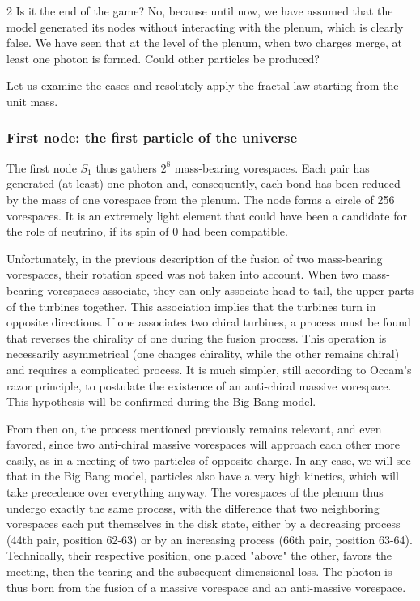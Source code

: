 \begin{multicols}{2}
	Is it the end of the game? No, because until now, we have assumed that 
	the model generated its nodes without interacting with the plenum, which 
	is clearly false. We have seen that at the level of the plenum, when two 
	charges merge, at least one photon is formed. Could other particles be 
	produced?
	
	Let us examine the cases and resolutely apply the fractal law starting 
	from the unit mass.
	
	\subsubsection{First node: the first particle of the universe}
	
	The first node $S_1$ thus gathers $2^8$ mass-bearing vorespaces. Each pair 
	has generated (at least) one photon and, consequently, each bond has been 
	reduced by the mass of one vorespace from the plenum. The node forms a 
	circle of 256 vorespaces. It is an extremely light element that could 
	have been a candidate for the role of neutrino, if its spin of 0 had been 
	compatible.
	
	Unfortunately, in the previous description of the fusion of two mass-bearing 
	vorespaces, their rotation speed was not taken into account. When two 
	mass-bearing vorespaces associate, they can only associate head-to-tail, the 
	upper parts of the turbines together. This association implies that the 
	turbines turn in opposite directions. If one associates two chiral 
	turbines, a process must be found that reverses the chirality of one 
	during the fusion process. This operation is necessarily asymmetrical 
	(one changes chirality, while the other remains chiral) and requires a 
	complicated process. It is much simpler, still according to Occam's 
	razor principle, to postulate the existence of an anti-chiral massive 
	vorespace. This hypothesis will be confirmed during the Big Bang model.
	
	From then on, the process mentioned previously remains relevant, and even 
	favored, since two anti-chiral massive vorespaces will approach each 
	other more easily, as in a meeting of two particles of opposite charge. 
	In any case, we will see that in the Big Bang model, particles also have 
	a very high kinetics, which will take precedence over everything 
	anyway. The vorespaces of the plenum thus undergo exactly the same 
	process, with the difference that two neighboring vorespaces each put 
	themselves in the disk state, either by a decreasing process (44th pair, 
	position 62-63) or by an increasing process (66th pair, position 63-64). 
	Technically, their respective position, one placed "above" the other, 
	favors the meeting, then the tearing and the subsequent dimensional loss. 
	The photon is thus born from the fusion of a massive vorespace and an 
	anti-massive vorespace.
	

\end{multicols}
